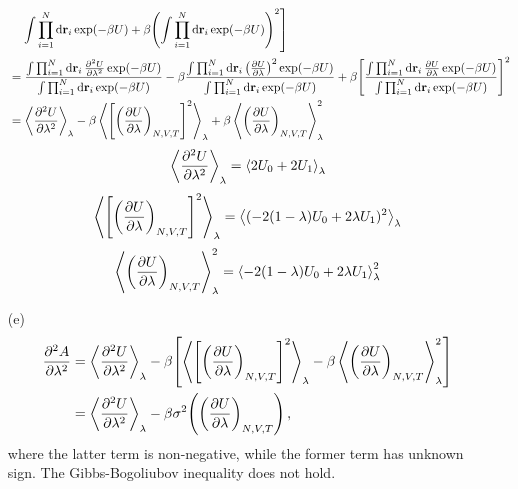 \documentclass{article}
\begin{document}
\begin{enumerate}
\begin{align*}
            &\quad\left.\int\prod_{i=1}^{N}\dd{\vb{r}_i}\exp(-\beta U)+\beta\qty(\int\prod_{i=1}^{N}\dd{\vb{r}_i}\exp(-\beta U))^2\right]\\
            &=\frac{\int\prod_{i=1}^{N}\dd{\vb{r}_i}\pdv[2]{U}{\lambda}\exp(-\beta U)}{\int\prod_{i=1}^{N}\dd{\vb{r}_i}\exp(-\beta U)}-\beta\frac{\int\prod_{i=1}^{N}\dd{\vb{r}_i}\qty(\pdv{U}{\lambda})^2\exp(-\beta U)}{\int\prod_{i=1}^{N}\dd{\vb{r}_i}\exp(-\beta U)}+\beta\qty[\frac{\int\prod_{i=1}^{N}\dd{\vb{r}_i}\pdv{U}{\lambda}\exp(-\beta U)}{\int\prod_{i=1}^{N}\dd{\vb{r}_i}\exp(-\beta U)}]^2\\
            &=\expval{\pdv[2]{U}{\lambda}}_\lambda-\beta\expval{\qty[\qty(\pdv{U}{\lambda})_{N,V,T}]^2}_\lambda+\beta\expval{\qty(\pdv{U}{\lambda})_{N,V,T}}^2_\lambda
        \end{align*}
        $$\expval{\pdv[2]{U}{\lambda}}_\lambda=\expval{2U_0+2U_1}_\lambda$$
        $$\expval{\qty[\qty(\pdv{U}{\lambda})_{N,V,T}]^2}_\lambda=\expval{(-2(1-\lambda)U_0+2\lambda U_1)^2}_\lambda$$
        $$\expval{\qty(\pdv{U}{\lambda})_{N,V,T}}^2_\lambda=\expval{-2(1-\lambda)U_0+2\lambda U_1}^2_\lambda$$
        \item[(e)]
        \begin{align*}
            \pdv[2]{A}{\lambda}&=\expval{\pdv[2]{U}{\lambda}}_\lambda-\beta\qty[\expval{\qty[\qty(\pdv{U}{\lambda})_{N,V,T}]^2}_\lambda-\beta\expval{\qty(\pdv{U}{\lambda})_{N,V,T}}^2_\lambda]\\
            &=\expval{\pdv[2]{U}{\lambda}}_\lambda-\beta\sigma^2\qty(\qty(\pdv{U}{\lambda})_{N,V,T})\,,
        \end{align*}
        where the latter term is non-negative, while the former term has unknown sign. The Gibbs-Bogoliubov inequality does not hold.
    \end{enumerate}
\end{document}
